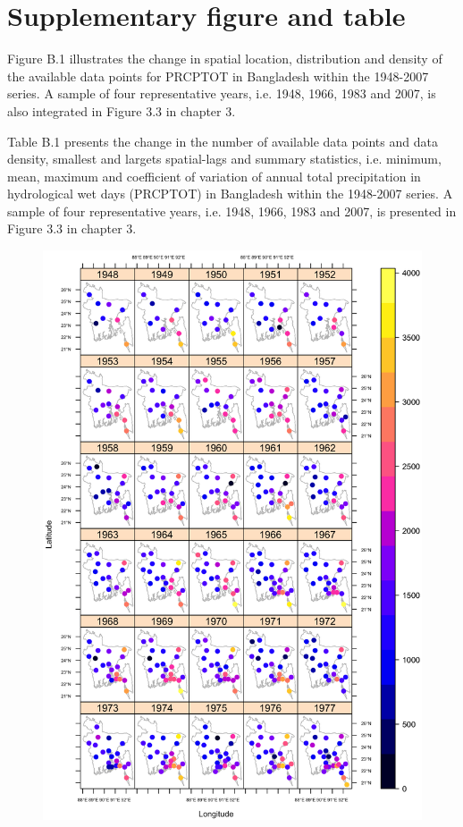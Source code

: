 \section{Supplementary figure and table}
\label{Supplementary figure and table}

Figure B.1 illustrates the change in spatial location, distribution and density of the available data points for PRCPTOT in Bangladesh within the 1948-2007 series. A sample of four representative years, i.e. 1948, 1966, 1983 and 2007, is also integrated in Figure 3.3 in chapter 3.

Table B.1 presents the change in the number of available data points and data density, smallest and largets spatial-lags and summary statistics, i.e. minimum, mean, maximum and coefficient of variation of annual total precipitation in hydrological wet days (PRCPTOT) in Bangladesh within the 1948-2007 series. A sample of four representative years, i.e. 1948, 1966, 1983 and 2007, is presented in Figure 3.3 in chapter 3.

\begin{figure}[h!]
  \centering
  \includegraphics[width=\textwidth]{Figures/Fig_B_1_a.png}
  \label{Fig_B_1_a}
\end{figure}

